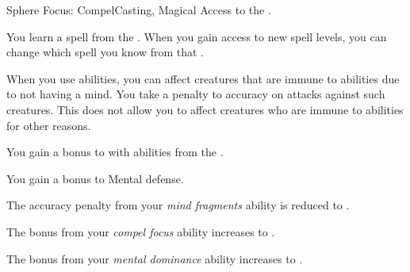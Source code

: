     \begin{feat}{Sphere Focus: Compel}{Casting, Magical}
        \featpre Access to the  .

         You learn a spell from the  .
        When you gain access to new spell levels, you can change which spell you know from that .

         When you use  abilities, you can affect creatures that are immune to  abilities due to not having a mind.
        You take a  penalty to accuracy on attacks against such creatures.
        This does not allow you to affect creatures who are immune to  abilities for other reasons.

         You gain a  bonus to  with abilities from the  .

         You gain a  bonus to Mental defense.

         The accuracy penalty from your \textit{mind fragments} ability is reduced to .

         The bonus from your \textit{compel focus} ability increases to .

         The bonus from your \textit{mental dominance} ability increases to .
    \end{feat}

